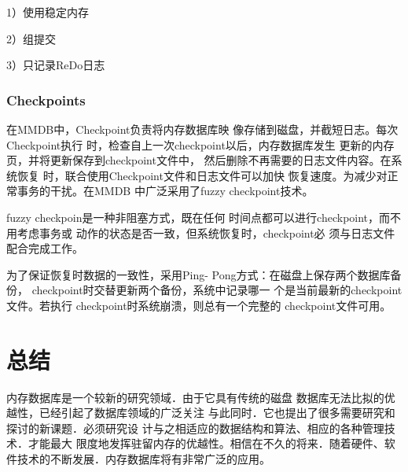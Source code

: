 \documentclass[literaturereview]{zjutreport}
\begin{document}
1）使用稳定内存

2）组提交

3）只记录ReDo日志

\subsection{Checkpoints}
在MMDB中，Checkpoint负责将内存数据库映
像存储到磁盘，并截短日志。每次Checkpoint执行
时，检查自上一次checkpoint以后，内存数据库发生
更新的内存页，并将更新保存到checkpoint文件中，
然后删除不再需要的日志文件内容。在系统恢复
时，联合使用Checkpoint文件和日志文件可以加快
恢复速度。为减少对正常事务的干扰。在MMDB
中广泛采用了fuzzy checkpoint技术。

fuzzy checkpoin是一种非阻塞方式，既在任何
时间点都可以进行checkpoint，而不用考虑事务或
动作的状态是否一致，但系统恢复时，checkpoint必
须与日志文件配合完成工作。

为了保证恢复时数据的一致性，采用Ping-
Pong方式：在磁盘上保存两个数据库备份，
checkpoint时交替更新两个备份，系统中记录哪一
个是当前最新的checkpoint文件。若执行
checkpoint时系统崩溃，则总有一个完整的
checkpoint文件可用。

\chapter{总结}
内存数据库是一个较新的研究领域．由于它具有传统的磁盘
数据库无法比拟的优越性，已经引起了数据库领域的广泛关注
与此同时．它也提出了很多需要研究和探讨的新课题．必须研究设
计与之相适应的数据结构和算法、相应的各种管理技术．才能最大
限度地发挥驻留内存的优越性。相信在不久的将来．随着硬件、软
件技术的不断发展．内存数据库将有非常广泛的应用。

\backmatter
\endgroup %
\clearpage %


\nocite{*}                                   %

\end{document}
